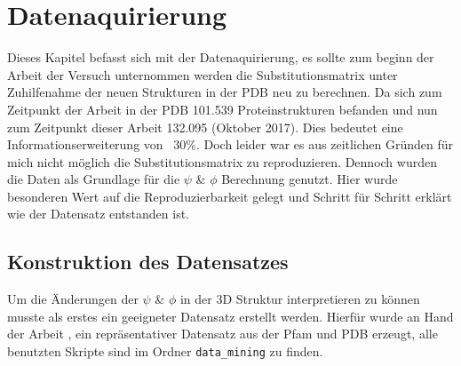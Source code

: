 \chapter[Datenaquirierung]{Datenaquirierung}
\label{chap:Datenaquirierung}

Dieses Kapitel befasst sich mit der Datenaquirierung, es sollte zum beginn der Arbeit der Versuch unternommen werden die Substitutionsmatrix unter Zuhilfenahme der neuen Strukturen in der \ac{PDB} neu zu berechnen. Da sich zum Zeitpunkt der Arbeit \cite{Mathias.2014} in der \ac{PDB} 101.539 Proteinstrukturen befanden und nun zum Zeitpunkt dieser Arbeit 132.095 (Oktober 2017). Dies bedeutet eine Informationserweiterung von ~30\%. Doch leider war es aus zeitlichen Gründen für mich nicht möglich die Substitutionsmatrix zu reproduzieren. Dennoch wurden die Daten als Grundlage für die $\psi$ \& $\phi$ Berechnung genutzt. Hier wurde besonderen Wert auf die Reproduzierbarkeit gelegt und Schritt für Schritt erklärt wie der Datensatz entstanden ist.



\section{Konstruktion des Datensatzes}
\label{sec:konst}

Um die Änderungen der $\psi$ \& $\phi$ in der 3D Struktur interpretieren zu können musste als erstes ein geeigneter Datensatz erstellt werden. Hierfür wurde an Hand der Arbeit \cite{Mathias.2014}, ein repräsentativer Datensatz aus der \ac{Pfam} und \ac{PDB} erzeugt, alle benutzten Skripte sind im Ordner \texttt{data\_mining} zu finden. 


